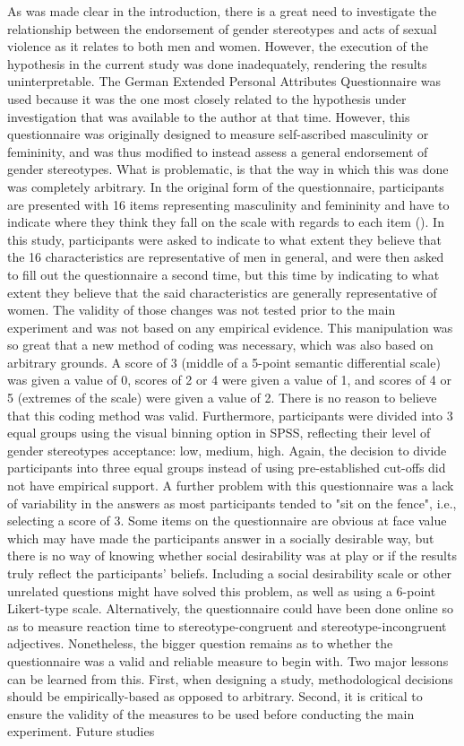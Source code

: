 \documentclass[serif, authordate, twocolumn, empirical]{jote-article}
\begin{document}
As was made clear in the introduction, there is a great need to investigate the relationship between the endorsement of gender stereotypes and acts of sexual violence as it relates to both men and women. However, the execution of the hypothesis in the current study was done inadequately, rendering the results uninterpretable. The German Extended Personal Attributes Questionnaire was used because it was the one most closely related to the hypothesis under investigation that was available to the author at that time. However, this questionnaire was originally designed to measure self-ascribed masculinity or femininity, and was thus modified to instead assess a general endorsement of gender stereotypes. What is problematic, is that the way in which this was done was completely arbitrary. In the original form of the questionnaire, participants are presented with 16 items representing masculinity and femininity and have to indicate where they think they fall on the scale with regards to each item (\cite{RungeFreyGollwitzerHelmreichSpence1981}). In this study, participants were asked to indicate to what extent they believe that the 16 characteristics are representative of men in general, and were then asked to fill out the questionnaire a second time, but this time by indicating to what extent they believe that the said characteristics are generally representative of women. The validity of those changes was not tested prior to the main experiment and was not based on any empirical evidence. This manipulation was so great that a new method of coding was necessary, which was also based on arbitrary grounds. A score of 3 (middle of a 5-point semantic differential scale) was given a value of 0, scores of 2 or 4 were given a value of 1, and scores of 4 or 5 (extremes of the scale) were given a value of 2. There is no reason to believe that this coding method was valid. Furthermore, participants were divided into 3 equal groups using the visual binning option in SPSS, reflecting their level of gender stereotypes acceptance: low, medium, high. Again, the decision to divide participants into three equal groups instead of using pre-established cut-offs did not have empirical support. A further problem with this questionnaire was a lack of variability in the answers as most participants tended to "sit on the fence", i.e., selecting a score of 3. Some items on the questionnaire are obvious at face value which may have made the participants answer in a socially desirable way, but there is no way of knowing whether social desirability was at play or if the results truly reflect the participants’ beliefs. Including a social desirability scale or other unrelated questions might have solved this problem, as well as using a 6-point Likert-type scale. Alternatively, the questionnaire could have been done online so as to measure reaction time to stereotype-congruent and stereotype-incongruent adjectives. Nonetheless, the bigger question remains as to whether the questionnaire was a valid and reliable measure to begin with. Two major lessons can be learned from this. First, when designing a study, methodological decisions should be empirically-based as opposed to arbitrary. Second, it is critical to ensure the validity of the measures to be used before conducting the main experiment. Future studies 
\end{document}
